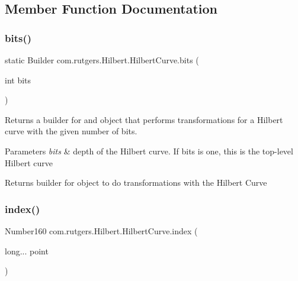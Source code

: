 \subsection{Member Function Documentation}
\mbox{\label{classcom_1_1rutgers_1_1Hilbert_1_1HilbertCurve_a4393620f0fcf8591df040ceaeb55e756}} 
\subsubsection{\texorpdfstring{bits()}{bits()}}
{\footnotesize\ttfamily static Builder com.\+rutgers.\+Hilbert.\+Hilbert\+Curve.\+bits (\begin{DoxyParamCaption}\item[{int}]{bits }\end{DoxyParamCaption})\hspace{0.3cm}{\ttfamily [static]}}

Returns a builder for and object that performs transformations for a Hilbert curve with the given number of bits.


\begin{DoxyParams}{Parameters}
{\em bits} & depth of the Hilbert curve. If bits is one, this is the top-\/level Hilbert curve \\
\hline
\end{DoxyParams}
\begin{DoxyReturn}{Returns}
builder for object to do transformations with the Hilbert Curve 
\end{DoxyReturn}
\mbox{\label{classcom_1_1rutgers_1_1Hilbert_1_1HilbertCurve_acf26ba609b064facad3b7e74a3958978}} 
\subsubsection{\texorpdfstring{index()}{index()}}
{\footnotesize\ttfamily Number160 com.\+rutgers.\+Hilbert.\+Hilbert\+Curve.\+index (\begin{DoxyParamCaption}\item[{long...}]{point }\end{DoxyParamCaption})}

